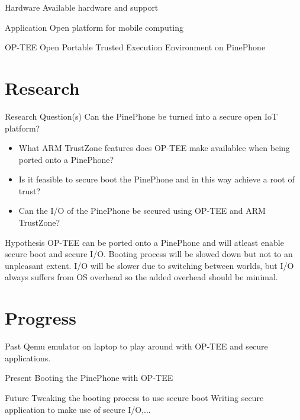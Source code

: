 \documentclass[]{beamer}
\begin{document}
\begin{frame}{Hardware}
Available hardware and support
\end{frame}

\begin{frame}{Application}
Open platform for mobile computing
\end{frame}

\begin{frame}{OP-TEE}
Open Portable Trusted Execution Environment on PinePhone
\end{frame}

\section{Research}

\begin{frame}{Research Question(s)}
Can the PinePhone be turned into a secure open IoT platform?
\begin{itemize}
\item What ARM TrustZone features does OP-TEE make availablee when being ported onto a PinePhone?
\item Is it feasible to secure boot the PinePhone and in this way achieve a root of trust?
\item Can the I/O of the PinePhone be secured using OP-TEE and ARM TrustZone?
\end{itemize}
\end{frame}

\begin{frame}{Hypothesis}
OP-TEE can be ported onto a PinePhone and will atleast enable secure boot and secure I/O.
Booting process will be slowed down but not to an unpleasant extent.
I/O will be slower due to switching between worlds, but I/O always suffers from OS overhead so the added overhead should be minimal.
\end{frame}

\section{Progress}

\begin{frame}{Past}
Qemu emulator on laptop to play around with OP-TEE and secure applications.
\end{frame}

\begin{frame}{Present}
Booting the PinePhone with OP-TEE
\end{frame}

\begin{frame}{Future}
Tweaking the booting process to use secure boot
Writing secure application to make use of secure I/O,...
\end{frame}
\end{document}

